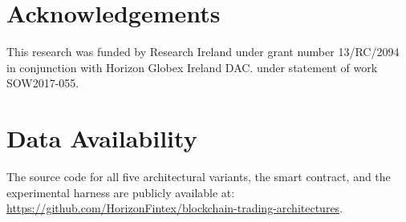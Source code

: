 \section*{Acknowledgements}
This research was funded by Research Ireland under grant number 13/RC/2094 in conjunction with Horizon Globex Ireland DAC. under statement of work SOW2017-055.

\section*{Data Availability}
The source code for all five architectural variants, the smart contract, and the experimental harness are publicly available at: \url{https://github.com/HorizonFintex/blockchain-trading-architectures}.
